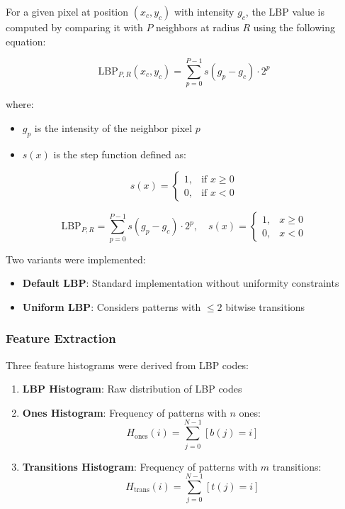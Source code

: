 \documentclass[a4paper,12pt]{report}
\begin{document}
For a given pixel at position $(x_c, y_c)$ with intensity $g_c$, the LBP value is computed by comparing it with $P$ neighbors at radius $R$ using the following equation:

\begin{equation}
\text{LBP}_{P,R}(x_c, y_c) = \sum_{p=0}^{P-1} s(g_p - g_c) \cdot 2^p
\end{equation}

where:
\begin{itemize}
    \item $g_p$ is the intensity of the neighbor pixel $p$
    \item $s(x)$ is the step function defined as:
\end{itemize}

\begin{equation}
s(x) = 
\begin{cases}
1, & \text{if } x \geq 0 \\
0, & \text{if } x < 0
\end{cases}
\end{equation}

\begin{equation}
\text{LBP}_{P,R} = \sum_{p=0}^{P-1} s(g_p - g_c) \cdot 2^p,\quad s(x) = 
\begin{cases}
1, & x \geq 0 \\
0, & x < 0
\end{cases}
\end{equation}

Two variants were implemented:
\begin{itemize}
    \item \textbf{Default LBP}: Standard implementation without uniformity constraints
    \item \textbf{Uniform LBP}: Considers patterns with $\leq 2$ bitwise transitions
\end{itemize}

\subsubsection{Feature Extraction}
\label{subsec:feature_extraction}

Three feature histograms were derived from LBP codes:

\begin{enumerate}
    \item \textbf{LBP Histogram}: Raw distribution of LBP codes
    
    \item \textbf{Ones Histogram}: Frequency of patterns with $n$ ones:
    \begin{equation}
    H_{\text{ones}}(i) = \sum_{j=0}^{N-1} [b(j) = i]
    \end{equation}
    
    \item \textbf{Transitions Histogram}: Frequency of patterns with $m$ transitions:
    \begin{equation}
    H_{\text{trans}}(i) = \sum_{j=0}^{N-1} [t(j) = i]
    \end{equation}
\end{enumerate}
\end{document}

